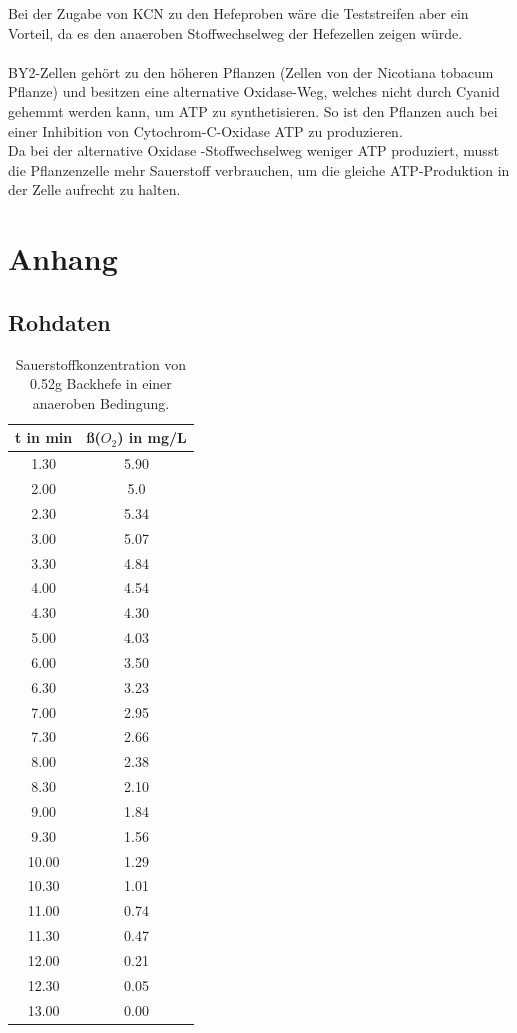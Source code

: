 \documentclass[10pt,a4paper]{article}
\begin{document}
	Bei der Zugabe von KCN zu den Hefeproben wäre die Teststreifen aber ein Vorteil, da es den anaeroben Stoffwechselweg der Hefezellen zeigen würde.\\
	\\
	BY2-Zellen gehört zu den höheren Pflanzen (Zellen von der Nicotiana tobacum Pflanze) und besitzen eine alternative Oxidase-Weg, welches nicht durch Cyanid gehemmt werden kann, um ATP zu synthetisieren. So ist den Pflanzen auch bei einer Inhibition von Cytochrom-C-Oxidase ATP zu produzieren.\\
	Da bei der alternative Oxidase -Stoffwechselweg weniger ATP produziert, musst die Pflanzenzelle mehr Sauerstoff verbrauchen, um die gleiche ATP-Produktion in der Zelle aufrecht zu halten.\\
	
	\section{Anhang}
	\subsection{Rohdaten}
	
	\begin{table}[H]
		\centering
		\caption{Sauerstoffkonzentration von 0.52g Backhefe in einer anaeroben Bedingung.}
		\label{tab:O2 Backhefe ohne KCN}
		\begin{tabular}{cc}
			\toprule
			t in min& ß($O_2$) in mg/L\\
			\midrule
			1.30 & 5.90\\
			2.00 & 5.0\\
			2.30 & 5.34\\
			3.00 & 5.07\\
			3.30 & 4.84 \\
			4.00 & 4.54 \\
			4.30 & 4.30 \\
			5.00 & 4.03 \\
			6.00 & 3.50 \\
			6.30 & 3.23\\
			7.00 & 2.95\\
			7.30 & 2.66\\
			8.00 & 2.38\\
			8.30 & 2.10 \\
			9.00 & 1.84\\
			9.30 & 1.56 \\
			10.00 & 1.29\\
			10.30 & 1.01\\
			11.00 & 0.74\\
			11.30 & 0.47\\
			12.00 & 0.21\\
			12.30 & 0.05\\
			13.00 & 0.00\\			
			\bottomrule
		\end{tabular}
	\end{table}	
	
\end{document}
